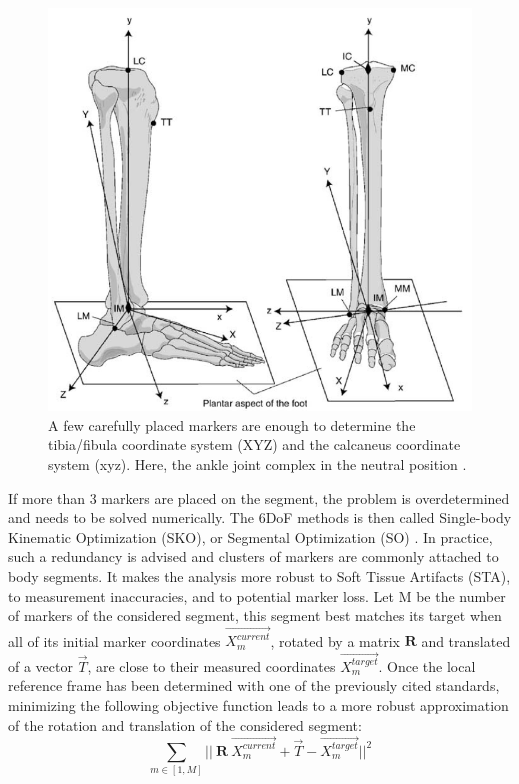 \begin{figure}[!ht]
	\centering
	\def\svgwidth{1\columnwidth}
	\fontsize{10pt}{10pt}\selectfont
	\includegraphics[width=0.7\linewidth]{"../Chap2/Figures/ISBaxis.PNG"}
	\caption{A few carefully placed markers are enough to determine the tibia/fibula coordinate system (XYZ) and the calcaneus coordinate system (xyz). Here, the ankle joint complex in the neutral position \cite{Wu2002}.}
	\label{fig_isb}
\end{figure}

If more than 3 markers are placed on the segment, the problem is overdetermined and needs to be solved numerically. The 6DoF methods is then called Single-body Kinematic Optimization (SKO), or Segmental Optimization (SO) \cite{Lu1999}. In practice, such a redundancy is advised and clusters of markers are commonly attached to body segments. It makes the analysis more robust to Soft Tissue Artifacts (STA), to measurement inaccuracies, and to potential marker loss. Let M be the number of markers of the considered segment, this segment best matches its target when all of its initial marker coordinates $\overrightarrow{X^{current}_m}$, rotated by a matrix $\textbf{R}$ and translated of a vector $\overrightarrow{T}$, are close to their measured coordinates $\overrightarrow{X^{target}_m}$. Once the local reference frame has been determined with one of the previously cited standards, minimizing the following objective function leads to a more robust approximation of the rotation and translation of the considered segment: 
\begin{equation}
  \sum_{m \in [1,M]}
  ||\ \textbf{R} \ \overrightarrow{X^{current}_m} + \overrightarrow{T} - \overrightarrow{X^{target}_m} ||^2
\end{equation} 

